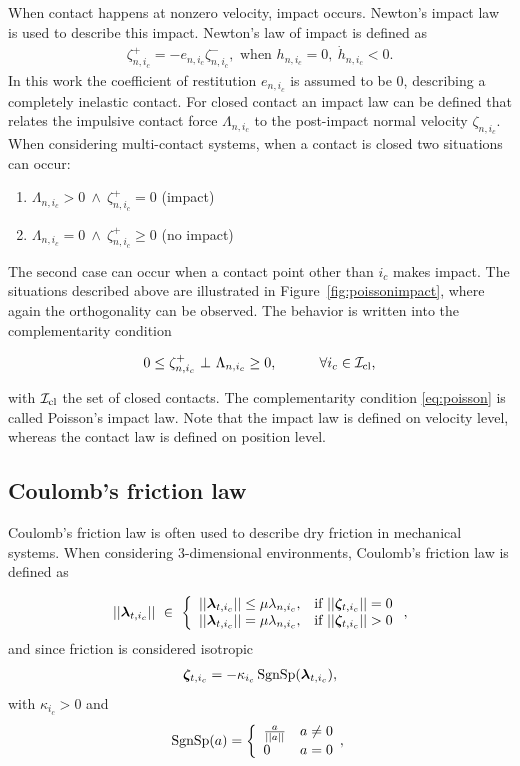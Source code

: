 \documentclass[../DC2017114Bouma.tex]{subfiles}
\begin{document}
When contact happens at nonzero velocity, impact occurs. Newton's impact law is used to describe this impact. Newton's law of impact is defined as
\begin{align}
\zeta^+_{n,i_c} = -e_{n,i_c}\zeta^-_{n,i_c},\text{ when }h_{n,i_c}=0,\ \dot{h}_{n,i_c}<0.
\end{align}
In this work the coefficient of restitution $e_{n,i_c}$ is assumed to be $0$, describing a completely inelastic contact. For closed contact an impact law can be defined that relates the impulsive contact force $\Lambda_{n,i_c}$ to the post-impact normal velocity $\zeta_{n,i_c}$. When considering multi-contact systems, when a contact is closed two situations can occur:
\begin{enumerate}
\item $\Lambda_{n,i_c} > 0\ \wedge\ \zeta^+_{n,i_c} = 0$ (impact)
\item $\Lambda_{n,i_c} = 0\ \wedge\ \zeta^+_{n,i_c} \geq 0$ (no impact)
\end{enumerate}
The second case can occur when a contact point other than $i_c$ makes impact. The situations described above are illustrated in Figure~\ref{fig:poissonimpact}, where again the orthogonality can be observed. The behavior is written into the complementarity condition

\begin{align}
0\leq \zeta^+_{n,i_c}\ \bot\ \Lambda_{n,i_c} \geq 0,\quad  \qquad \forall i_c\in\mathcal{I}_{\text{cl}},\label{eq:poisson}
\end{align}

with $\mathcal{I}_{\text{cl}}$ the set of closed contacts. The complementarity condition \eqref{eq:poisson} is called Poisson's impact law. Note that the impact law is defined on velocity level, whereas the contact law is defined on position level.
\subsection{Coulomb's friction law}
Coulomb's friction law is often used to describe dry friction in mechanical systems. When considering 3-dimensional environments, Coulomb's friction law is defined as 

\begin{align}
||\lambdab_{t,i_c}||\ \in\ \left\{ \begin{array}{ll}
||\lambdab_{t,i_c}||\leq\mu\lambda_{n,i_c}, &\text{if }||\zetab_{t,i_c}||=0\\
||\lambdab_{t,i_c}|| = \mu\lambda_{n,i_c}, &\text{if }||\zetab_{t,i_c}||>0
\end{array}\right.,\label{eq:frictionlen}
\end{align}
and since friction is considered isotropic
\begin{align}
\boldsymbol{\zeta}_{t,i_c} = -\kappa_{i_c}\operatorname{\text{SgnSp}}(\boldsymbol{\lambda}_{t,i_c}),\label{eq:frictiondir}
\end{align}
with $\kappa_{i_c}>0$ and
\begin{equation}
\operatorname{\text{SgnSp}}(a) = \left\lbrace\begin{array}{ll}
\frac{a}{||a||} & a \neq 0\\
0 & a = 0
\end{array},\right.
\end{equation}
\end{document}
